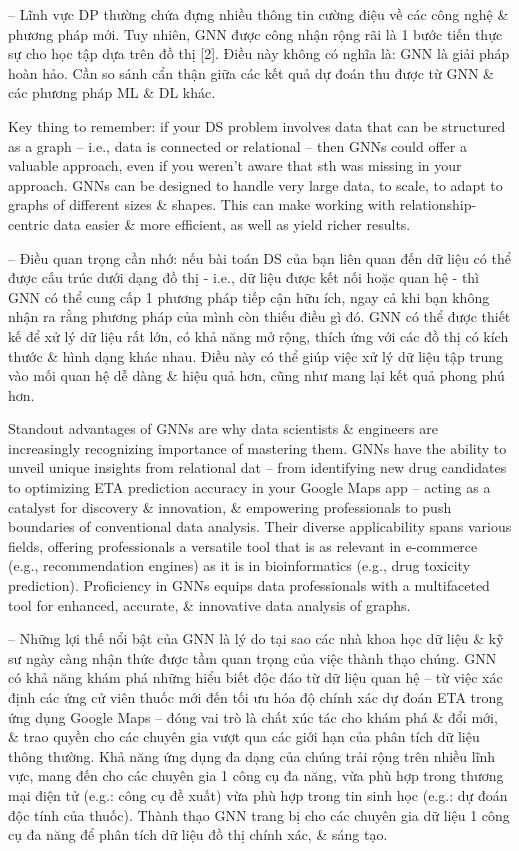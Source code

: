 \documentclass{article}
\begin{document}
\begin{itemize}
    -- Lĩnh vực DP thường chứa đựng nhiều thông tin cường điệu về các công nghệ \& phương pháp mới. Tuy nhiên, GNN được công nhận rộng rãi là 1 bước tiến thực sự cho học tập dựa trên đồ thị [2]. Điều này không có nghĩa là: GNN là giải pháp hoàn hảo. Cần so sánh cẩn thận giữa các kết quả dự đoán thu được từ GNN \& các phương pháp ML \& DL khác.

    Key thing to remember: if your DS problem involves data that can be structured as a graph -- i.e., data is connected or relational -- then GNNs could offer a valuable approach, even if you weren't aware that sth was missing in your approach. GNNs can be designed to handle very large data, to scale, to adapt to graphs of different sizes \& shapes. This can make working with relationship-centric data easier \& more efficient, as well as yield richer results.

    -- Điều quan trọng cần nhớ: nếu bài toán DS của bạn liên quan đến dữ liệu có thể được cấu trúc dưới dạng đồ thị - i.e., dữ liệu được kết nối hoặc quan hệ - thì GNN có thể cung cấp 1 phương pháp tiếp cận hữu ích, ngay cả khi bạn không nhận ra rằng phương pháp của mình còn thiếu điều gì đó. GNN có thể được thiết kế để xử lý dữ liệu rất lớn, có khả năng mở rộng, thích ứng với các đồ thị có kích thước \& hình dạng khác nhau. Điều này có thể giúp việc xử lý dữ liệu tập trung vào mối quan hệ dễ dàng \& hiệu quả hơn, cũng như mang lại kết quả phong phú hơn.

    Standout advantages of GNNs are why data scientists \& engineers are increasingly recognizing importance of mastering them. GNNs have the ability to unveil unique insights from relational dat -- from identifying new drug candidates to optimizing ETA prediction accuracy in your Google Maps app -- acting as a catalyst for discovery \& innovation, \& empowering professionals to push boundaries of conventional data analysis. Their diverse applicability spans various fields, offering professionals a versatile tool that is as relevant in e-commerce (e.g., recommendation engines) as it is in bioinformatics (e.g., drug toxicity prediction). Proficiency in GNNs equips data professionals with a multifaceted tool for enhanced, accurate, \& innovative data analysis of graphs.

    -- Những lợi thế nổi bật của GNN là lý do tại sao các nhà khoa học dữ liệu \& kỹ sư ngày càng nhận thức được tầm quan trọng của việc thành thạo chúng. GNN có khả năng khám phá những hiểu biết độc đáo từ dữ liệu quan hệ -- từ việc xác định các ứng cử viên thuốc mới đến tối ưu hóa độ chính xác dự đoán ETA trong ứng dụng Google Maps -- đóng vai trò là chất xúc tác cho khám phá \& đổi mới, \& trao quyền cho các chuyên gia vượt qua các giới hạn của phân tích dữ liệu thông thường. Khả năng ứng dụng đa dạng của chúng trải rộng trên nhiều lĩnh vực, mang đến cho các chuyên gia 1 công cụ đa năng, vừa phù hợp trong thương mại điện tử (e.g.: công cụ đề xuất) vừa phù hợp trong tin sinh học (e.g.: dự đoán độc tính của thuốc). Thành thạo GNN trang bị cho các chuyên gia dữ liệu 1 công cụ đa năng để phân tích dữ liệu đồ thị chính xác, \& sáng tạo.


\end{itemize}
\end{document}
